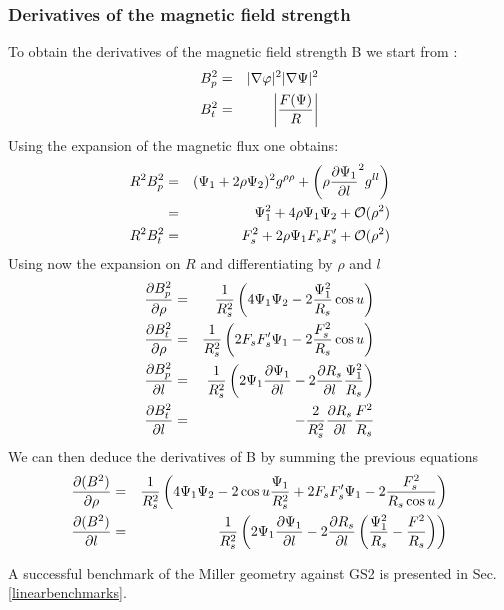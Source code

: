 \subsubsection{Derivatives of the magnetic field strength}
To obtain the derivatives of the magnetic field strength B we start from \cite{CAN09}:
\begin{eqnarray}
B_p^2 &=& |\nabla \varphi|^2 |\nabla \Psi|^2 \\
B_t^2 &=& \left|{F(\Psi) \over R}\right|
\end{eqnarray}
Using the expansion of the magnetic flux one obtains: 
\begin{eqnarray}
R^2 B_p^2 &=& (\Psi_1 + 2 \rho \Psi_2)^2 g^{\rho \rho} + \left(\rho \frac{\partial  \Psi_1}{\partial l}^2 g^{ll}\right) \\
&=& \Psi_1^2 + 4 \rho \Psi_1 \Psi_2 + \mathcal{O}(\rho^2) \\
R^2 B_t^2 &=& F_s^2 + 2 \rho \Psi_1 F_s F_s' + \mathcal{O}(\rho^2)
\end{eqnarray}
Using now the expansion on $R$ and differentiating by $\rho$ and $l$ 
\begin{eqnarray}
\frac{\partial  B_p^2}{\partial \rho} &=& {1 \over R_s^2}\left(4 \Psi_1 \Psi_2 - 2 {\Psi_1^2 \over R_s} \cos u\right) \\
\frac{\partial  B_t^2}{\partial \rho} &=& {1 \over R_s^2}\left(2 F_s F_s' \Psi_1 - 2 {F_s^2 \over R_s} \cos u\right) \\
\frac{\partial  B_p^2}{\partial l} &=& {1 \over R_s^2}\left(2 \Psi_1 \frac{\partial  \Psi_1}{\partial l} - 2 \frac{\partial  R_s}{\partial l} {\Psi_1^2 \over R_s}\right) \\
\frac{\partial  B_t^2}{\partial l} &=& - {2 \over R_s^2} \frac{\partial  R_s}{\partial l} {F^2 \over R_s}
\end{eqnarray}
We can then deduce the derivatives of B by summing the previous equations
\begin{eqnarray}
\frac{\partial  (B^2)}{\partial \rho} &=& {1 \over R_s^2}\left(4 \Psi_1 \Psi_2 - 2 \cos u {\Psi_1 \over R_s^2} + 2 F_s F_s' \Psi_1 - 2 {F_s^2 \over R_s \cos u}\right) \\
\frac{\partial  (B^2)}{\partial l} &=& {1 \over R_s^2}\left(2 \Psi_1 \frac{\partial  \Psi_1}{\partial l} - 2 \frac{\partial  R_s}{\partial l}\left({\Psi_1^2 \over R_s}-{F^2 \over R_s}\right)\right)
\end{eqnarray}

A successful benchmark of the Miller geometry against GS2 is presented in Sec. \ref{linearbenchmarks}.


